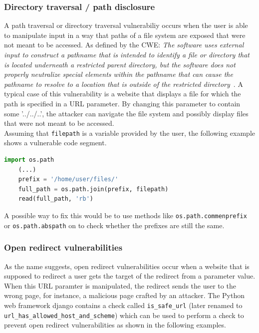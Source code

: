 \documentclass[
a4paper,
pagesize,
pdftex,
12pt,
ngerman,
fleqn,
final,
]{scrartcl}
\begin{document}
	\subsubsection{Directory traversal / path disclosure}
	A path traversal or directory traversal vulnerabiliy occurs when the user is able to manipulate input in a way that paths of a file system are exposed that were not meant to be accessed. 
	As defined by the CWE: \textit{The software uses external input to construct a pathname that is intended to identify a file or directory that is located underneath a restricted parent directory, but the software does not properly neutralize special elements within the pathname that can cause the pathname to resolve to a location that is outside of the restricted directory}~\cite{CommonWeaknessEnumeration.19.9.2019c}. A typical case of this vulnerability is a website that displays a file for which the path is specified in a URL parameter. By changing this parameter to contain some '../../..', the attacker can navigate the file system and possibly display files that were not meant to be accessed.\\
	Assuming that \texttt{filepath} is a variable provided by the user, the following example shows a vulnerable code segment.
	\begin{lstlisting}[language=Python, showstringspaces=False]
	import os.path
	(...)
	prefix = '/home/user/files/'
	full_path = os.path.join(prefix, filepath)
	read(full_path, 'rb')
	\end{lstlisting}
	A possible way to fix this would be to use methods like \texttt{os.path.commenprefix} or \texttt{os.path.abspath} on to check whether the prefixes are still the same. 
	
	
	
	\subsubsection{Open redirect vulnerabilities}
	As the name suggests, open redirect vulnerabilities occur when a website that is supposed to redirect a user gets the target of the redirect from a parameter value. When this URL paramter is manipulated, the redirect sends the user to the wrong page, for instance, a malicious page crafted by an attacker. The Python web framework django contains a check called \texttt{is\_safe\_url} (later renamed to \texttt{url\_has\_allowed\_host\_and\_scheme}) which can be used to perform a check to prevent open redirect vulnerabilities as shown in the following examples.
	
\end{document}
